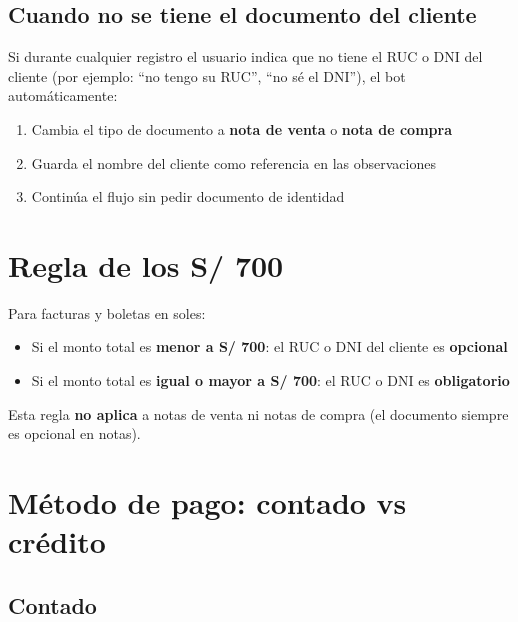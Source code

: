 \documentclass[12pt,a4paper]{article}
\begin{document}
\subsection{Cuando no se tiene el documento del cliente}

Si durante cualquier registro el usuario indica que no tiene el RUC o DNI del cliente (por ejemplo: ``no tengo su RUC'', ``no s\'e el DNI''), el bot autom\'aticamente:

\begin{enumerate}
    \item Cambia el tipo de documento a \textbf{nota de venta} o \textbf{nota de compra}
    \item Guarda el nombre del cliente como referencia en las observaciones
    \item Contin\'ua el flujo sin pedir documento de identidad
\end{enumerate}

\section{Regla de los S/ 700}

Para facturas y boletas en soles:

\begin{itemize}
    \item Si el monto total es \textbf{menor a S/ 700}: el RUC o DNI del cliente es \textbf{opcional}
    \item Si el monto total es \textbf{igual o mayor a S/ 700}: el RUC o DNI es \textbf{obligatorio}
\end{itemize}

Esta regla \textbf{no aplica} a notas de venta ni notas de compra (el documento siempre es opcional en notas).

\section{M\'etodo de pago: contado vs cr\'edito}

\subsection{Contado}
\end{document}
